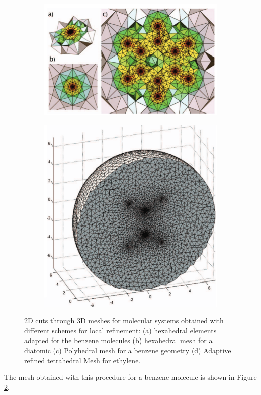 \begin{figure}
\begin{subfigure}{0.24\textwidth}
   \caption{}
   \label{fig:HexDia}
  \end{subfigure}
  \begin{subfigure}{0.24\textwidth}
   \includegraphics[width=.95\textwidth]{Figures/PolyBenzene}
   \caption{}
   \label{fig:PolyBenz}
  \end{subfigure}
  \begin{subfigure}{0.24\textwidth}
   \includegraphics[width=.95\textwidth]{Figures/AdaptiveEthylene}
   \caption{}
   \label{fig:AdapEthyl}
  \end{subfigure}
  \caption{2D cuts through 3D meshes for molecular systems obtained with different schemes for local refinement:
    (a) hexahedral elements adapted for the benzene molecules \cite{fe_dft1}
    (b) hexahedral mesh for a diatomic \cite{fe_hf}
    (c) Polyhedral mesh for a benzene geometry \cite{fe_dft2}
    (d) Adaptive refined tetrahedral Mesh for ethylene. \cite{fe_hf}
    }
\end{figure}
The mesh obtained with this procedure for a benzene molecule \cite{fe_dft1} is shown in Figure \ref{fig:PolyBenz}.

